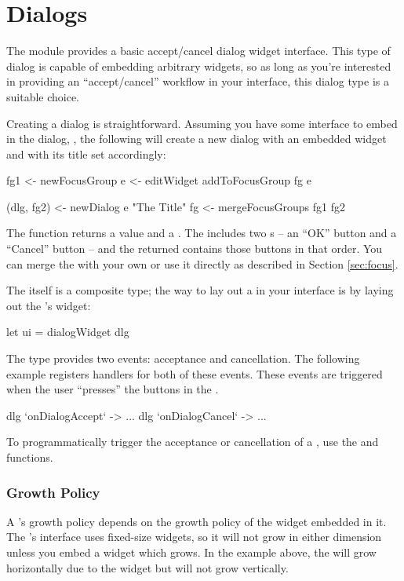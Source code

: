 \section{Dialogs}
\label{sec:dialogs}

The  module provides a basic accept/cancel dialog widget
interface.  This type of dialog is capable of embedding arbitrary
widgets, so as long as you're interested in providing an
``accept/cancel'' workflow in your interface, this dialog type is a
suitable choice.

Creating a dialog is straightforward.  Assuming you have some
interface to embed in the dialog, , the following will create a
new dialog with an embedded  widget and with its title set
accordingly:

\begin{haskellcode}
 fg1 <- newFocusGroup
 e <- editWidget
 addToFocusGroup fg e

 (dlg, fg2) <- newDialog e "The Title"
 fg <- mergeFocusGroups fg1 fg2
\end{haskellcode}

The  function returns a  value and a
.  The  includes two s -- an
``OK'' button and a ``Cancel'' button -- and the returned
 contains those buttons in that order.  You can merge
the  with your own or use it directly as described in
Section \ref{sec:focus}.

The  itself is a composite type; the way to lay out a
 in your interface is by laying out the 's
widget:

\begin{haskellcode}
 let ui = dialogWidget dlg
\end{haskellcode}

The  type provides two events: acceptance and cancellation.
The following example registers handlers for both of these events.
These events are triggered when the user ``presses'' the buttons in
the .

\begin{haskellcode}
 dlg `onDialogAccept` \this ->
   ...
 dlg `onDialogCancel` \this ->
   ...
\end{haskellcode}

To programmatically trigger the acceptance or cancellation of a
, use the  and 
functions.

\subsubsection{Growth Policy}

A 's growth policy depends on the growth policy of the
widget embedded in it.  The 's interface uses fixed-size
widgets, so it will not grow in either dimension unless you embed a
widget which grows.  In the example above, the  will grow
horizontally due to the  widget but will not grow vertically.
